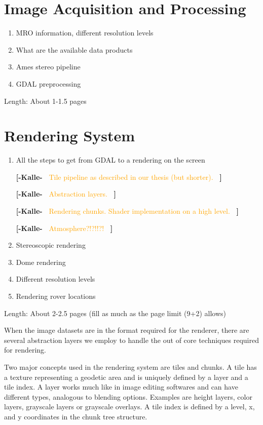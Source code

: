 \documentclass[journal]{vgtc}                %
\newcommand{\kallecomment}[1]{\textbf{[-Kalle-~}
    \textcolor{orange}{#1}
    \textbf{~]}}
\begin{document}
\section{Image Acquisition and Processing} \label{sec:imageacquisitionprocessing}
\begin{enumerate}
  \item MRO information, different resolution levels
  \item What are the available data products
  \item Ames stereo pipeline
  \item GDAL preprocessing
\end{enumerate}
Length: About 1-1.5 pages

\section{Rendering System} \label{sec:renderingsystem}


\begin{enumerate}
  \item All the steps to get from GDAL to a rendering on the screen
  
  \kallecomment{Tile pipeline as described in our thesis (but shorter).}
  
  \kallecomment{Abstraction layers.}
  
  \kallecomment{Rendering chunks. Shader implementation on a high level.}
  
  \kallecomment{Atmosphere?!?!!?!}
  
  \item Stereoscopic rendering
  \item Dome rendering
  \item Different resolution levels
  \item Rendering rover locations
\end{enumerate}
Length: About 2-2.5 pages (fill as much as the page limit (9+2) allows)


When the image datasets are in the format required for the renderer, there are several abstraction layers we employ to handle the out of core techniques required for rendering.

Two major concepts used in the rendering system are tiles and chunks. A tile has a texture representing a geodetic area and is uniquely defined by a layer and a tile index.
A layer works much like in image editing softwares and can have different types, analogous to blending options.
Examples are height layers, color layers, grayscale layers or grayscale overlays.
A tile index is defined by a level, x, and y coordinates in the chunk tree structure.
\end{document}
